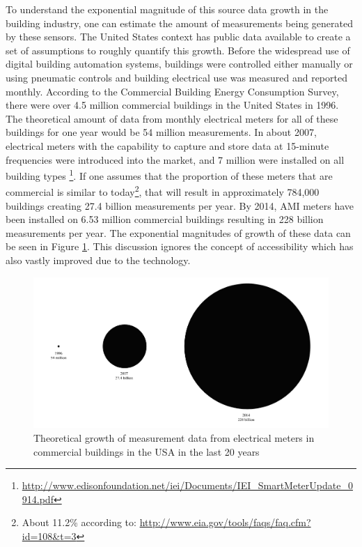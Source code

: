 To understand the exponential magnitude of this source data growth in the building industry, one can estimate the amount of measurements being generated by these sensors. The United States context has public data available to create a set of assumptions to roughly quantify this growth. Before the widespread use of digital building automation systems, buildings were controlled either manually or using pneumatic controls and building electrical use was measured and reported monthly. According to the Commercial Building Energy Consumption Survey, there were over 4.5 million commercial buildings in the United States in 1996. The theoretical amount of data from monthly electrical meters for all of these buildings for one year would be 54 million measurements. In about 2007, electrical meters with the capability to capture and store data at 15-minute frequencies were introduced into the market, and 7 million were installed on all building types \footnote{\url{http://www.edisonfoundation.net/iei/Documents/IEI_SmartMeterUpdate_0914.pdf}}. If one assumes that the proportion of these meters that are commercial is similar to today\footnote{About 11.2\% according to: \url{http://www.eia.gov/tools/faqs/faq.cfm?id=108\&t=3}}, that will result in approximately 784,000 buildings creating 27.4 billion measurements per year. By 2014, AMI meters have been installed on 6.53 million commercial buildings resulting in 228 billion measurements per year. The exponential magnitudes of growth of these data can be seen in Figure \ref{fig:datagrowth}. This discussion ignores the concept of accessibility which has also vastly improved due to the technology.

\begin{figure}[ht!]
\begin{center}
\includegraphics[width=0.98\columnwidth]{figures/Figure1_amountofdata/Figure1_amountofdata}
\caption{Theoretical growth of measurement data from electrical meters in commercial buildings in the USA in the last 20 years
\label{fig:datagrowth}%
}
\end{center}
\end{figure}

